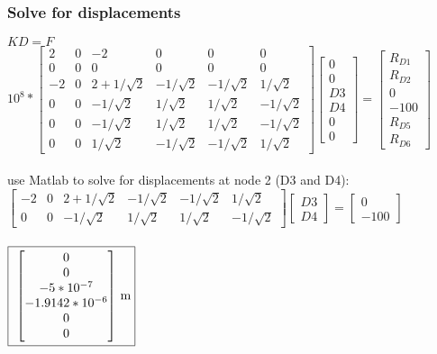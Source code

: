 \documentclass{article}
\begin{document}
\subsubsection*{Solve for displacements}
$KD=F$ \\
$10^8*\begin{bmatrix}
    2 & 0 & -2 & 0 & 0 & 0 \\
    0 & 0 & 0 & 0 & 0 & 0 \\
    -2 & 0 & 2+1/\sqrt{2} & -1/\sqrt{2} & -1/\sqrt{2} & 1/\sqrt{2} \\
    0 & 0 & -1/\sqrt{2} & 1/\sqrt{2} & 1/\sqrt{2} & -1/\sqrt{2} \\
    0 & 0 & -1/\sqrt{2} & 1/\sqrt{2} & 1/\sqrt{2} & -1/\sqrt{2} \\
    0 & 0 & 1/\sqrt{2} & -1/\sqrt{2} & -1/\sqrt{2} & 1/\sqrt{2}
\end{bmatrix}\begin{bmatrix}
    0 \\ 0 \\ D3 \\ D4 \\ 0 \\ 0
\end{bmatrix}=\begin{bmatrix}
    R_{D1} \\ R_{D2} \\ 0 \\ -100 \\ R_{D5} \\ R_{D6}
\end{bmatrix}$ \\\\
use Matlab to solve for displacements at node 2 (D3 and D4): \\
$\begin{bmatrix}
    -2 & 0 & 2+1/\sqrt{2} & -1/\sqrt{2} & -1/\sqrt{2} & 1/\sqrt{2} \\
    0 & 0 & -1/\sqrt{2} & 1/\sqrt{2} & 1/\sqrt{2} & -1/\sqrt{2}
\end{bmatrix}\begin{bmatrix}
    D3 \\ D4
\end{bmatrix}=\begin{bmatrix}
    0 \\ -100
\end{bmatrix}$ \\\\
$\fbox{
$\begin{bmatrix}
    0 \\ 0 \\ -5*10^{-7} \\ -1.9142*10^{-6} \\ 0 \\ 0
\end{bmatrix}$ m}$
\end{document}
